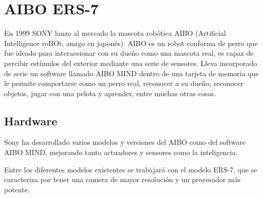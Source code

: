 \documentclass[12pt,a4paper,final,twoside]{book}
\begin{document}
\chapter{AIBO ERS-7}\label{secaibo}
\thispagestyle{fancy}
En 1999 SONY lanzo al mercado la mascota robótica AIBO (Artificial Intelligence roBOt, amigo en japonés). AIBO es un robot conforma de perro 
que fue ideado para interaccionar con su dueño como una mascota real, es capaz de percibir estímulos del exterior mediante una serie de sensores. Lleva incorporado de serie un software llamado AIBO MIND dentro de una tarjeta de memoria que le permite comportarse como un perro real, reconocer a su dueño, reconocer objetos, jugar con una pelota y aprender, entre muchas otras cosas.


\section{Hardware}
Sony ha desarrollado varios modelos y versiones del AIBO como del software AIBO MIND, mejorando tanto actuadores y sensores como la inteligencia.

Entre los diferentes modelos existentes se trabajará con el modelo ERS-7, que se caracteriza por tener una camera de mayor resolución y un procesador más potente.
\end{document}
